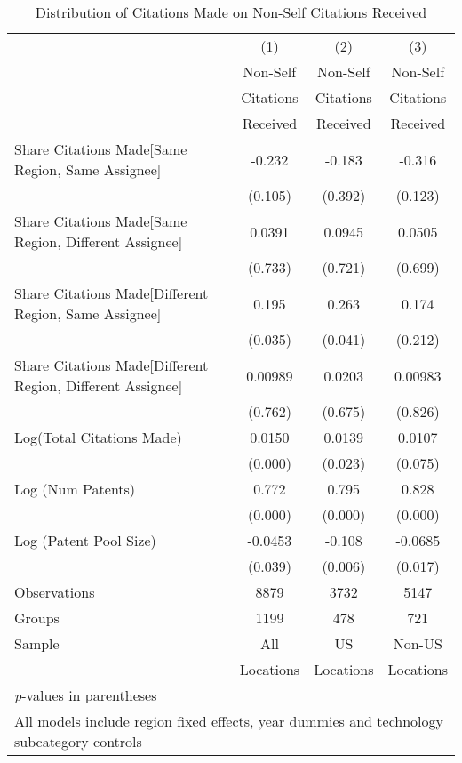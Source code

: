 {
\def\sym#1{\ifmmode^{#1}\else\(^{#1}\)\fi}
\begin{longtable}{l*{3}{c}}
\caption{Distribution of Citations Made on Non-Self Citations Received \label{model192021}}\\
\hline\hline\endfirsthead\hline\endhead\hline\endfoot\endlastfoot
                &\multicolumn{1}{c}{(1)}&\multicolumn{1}{c}{(2)}&\multicolumn{1}{c}{(3)}\\
                &\multicolumn{1}{c}{Non-Self}&\multicolumn{1}{c}{Non-Self}&\multicolumn{1}{c}{Non-Self}\\
                &\multicolumn{1}{c}{Citations}&\multicolumn{1}{c}{Citations}&\multicolumn{1}{c}{Citations}\\
                &\multicolumn{1}{c}{Received}&\multicolumn{1}{c}{Received}&\multicolumn{1}{c}{Received}\\
\hline
Share Citations Made[Same Region, Same Assignee]&   -0.232         &   -0.183         &   -0.316         \\
                &  (0.105)         &  (0.392)         &  (0.123)         \\
Share Citations Made[Same Region, Different Assignee]&   0.0391         &   0.0945         &   0.0505         \\
                &  (0.733)         &  (0.721)         &  (0.699)         \\
Share Citations Made[Different Region, Same Assignee]&    0.195  &    0.263  &    0.174         \\
                &  (0.035)         &  (0.041)         &  (0.212)         \\
Share Citations Made[Different Region, Different Assignee]&  0.00989         &   0.0203         &  0.00983         \\
                &  (0.762)         &  (0.675)         &  (0.826)         \\
Log(Total Citations Made)&   0.0150&   0.0139  &   0.0107         \\
                &  (0.000)         &  (0.023)         &  (0.075)         \\
Log (Num Patents)&    0.772&    0.795&    0.828\\
                &  (0.000)         &  (0.000)         &  (0.000)         \\
Log (Patent Pool Size)&  -0.0453  &   -0.108 &  -0.0685  \\
                &  (0.039)         &  (0.006)         &  (0.017)         \\
\hline
Observations    &     8879         &     3732         &     5147         \\
Groups          &     1199         &      478         &      721         \\
Sample&All &US &Non-US \\
          &Locations &Locations&Locations \\
\hline\hline
\multicolumn{4}{l}{\footnotesize \textit{p}-values in parentheses}\\
\multicolumn{4}{l}{\footnotesize All models include region fixed effects, year dummies and technology subcategory controls}\\
\end{longtable}
}
